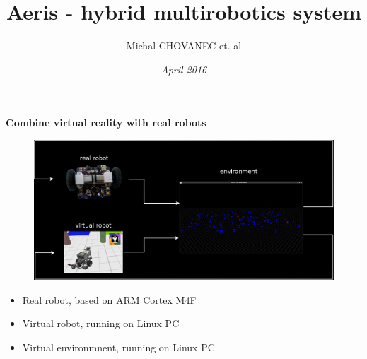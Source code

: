 \documentclass[xcolor=dvipsnames]{beamer}
\title{\bf Aeris - hybrid multirobotics system}
\author{Michal CHOVANEC et. al }
\date[EURP]{\it April 2016}
\begin{document}
\begin{frame}
\titlepage
\end{frame}

\begin{frame}{\bf Combine virtual reality with real robots}

\begin{figure}[!htb]
\centering
\includegraphics[scale=.2]{../diagrams/aeris_idea_inv.png}
\end{figure}

\begin{itemize}
  \item Real robot, based on ARM Cortex M4F
  \item Virtual robot, running on Linux PC
  \item Virtual environmnent, running on Linux PC
\end{itemize}


\end{frame}
\end{document}
